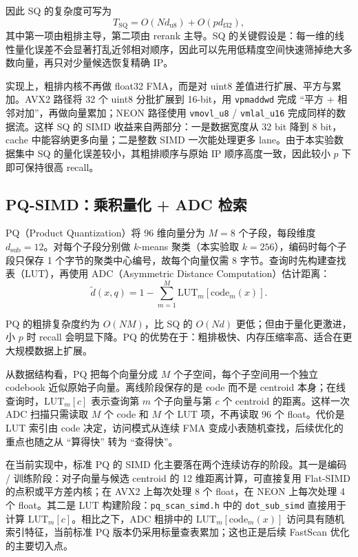 \documentclass[a4paper,11pt,UTF8]{ctexart}
\begin{document}
因此 SQ 的复杂度可写为
\[
T_{\mathrm{SQ}} = O(Nd_{\mathrm{u8}}) + O(pd_{\mathrm{f32}}),
\]
其中第一项由粗排主导，第二项由 rerank 主导。SQ 的关键假设是：每一维的线性量化误差不会显著打乱近邻相对顺序，因此可以先用低精度空间快速筛掉绝大多数向量，再只对少量候选恢复精确 IP。

实现上，粗排内核不再做 float32 FMA，而是对 uint8 差值进行扩展、平方与累加。AVX2 路径将 32 个 uint8 分批扩展到 16-bit，用 \texttt{vpmaddwd} 完成 ``平方 + 相邻对加''，再做向量累加；NEON 路径使用 \texttt{vmovl\_u8} / \texttt{vmlal\_u16} 完成同样的数据流。这样 SQ 的 SIMD 收益来自两部分：一是数据宽度从 32 bit 降到 8 bit，cache 中能容纳更多向量；二是整数 SIMD 一次能处理更多 lane。由于本实验数据集中 SQ 的量化误差较小，其粗排顺序与原始 IP 顺序高度一致，因此较小 $p$ 下即可保持很高 recall。

\subsection{PQ-SIMD：乘积量化 + ADC 检索}

PQ（Product Quantization）将 96 维向量分为 $M=8$ 个子段，每段维度 $d_{\text{sub}}=12$。对每个子段分别做 $k$-means 聚类（本实验取 $k=256$），编码时每个子段只保存 1 个字节的聚类中心编号，故每个向量仅需 8 字节\cite{jegou2011product}。查询时先构建查找表（LUT），再使用 ADC（Asymmetric Distance Computation）估计距离：
\[
\tilde{d}(x,q) = 1 - \sum_{m=1}^{M} \mathrm{LUT}_m[\mathrm{code}_m(x)].
\]

PQ 的粗排复杂度约为 $O(NM)$，比 SQ 的 $O(Nd)$ 更低；但由于量化更激进，小 $p$ 时 recall 会明显下降。PQ 的优势在于：粗排极快、内存压缩率高、适合在更大规模数据上扩展。

从数据结构看，PQ 把每个向量分成 $M$ 个子空间，每个子空间用一个独立 codebook 近似原始子向量。离线阶段保存的是 code 而不是 centroid 本身；在线查询时，LUT$_m[c]$ 表示查询第 $m$ 个子向量与第 $c$ 个 centroid 的距离。这样一次 ADC 扫描只需读取 $M$ 个 code 和 $M$ 个 LUT 项，不再读取 96 个 float。代价是 LUT 索引由 code 决定，访问模式从连续 FMA 变成小表随机查找，后续优化的重点也随之从 ``算得快'' 转为 ``查得快''。

在当前实现中，标准 PQ 的 SIMD 化主要落在两个连续访存的阶段。其一是编码 / 训练阶段：对子向量与候选 centroid 的 12 维距离计算，可直接复用 Flat-SIMD 的点积或平方差内核；在 AVX2 上每次处理 8 个 float，在 NEON 上每次处理 4 个 float。其二是 LUT 构建阶段：\texttt{pq\_scan\_simd.h} 中的 \texttt{dot\_sub\_simd} 直接用于计算 $\mathrm{LUT}_m[c]$。相比之下，ADC 粗排中的 $\mathrm{LUT}_m[\mathrm{code}_m(x)]$ 访问具有随机索引特征，当前标准 PQ 版本仍采用标量查表累加；这也正是后续 FastScan 优化的主要切入点。
\end{document}
